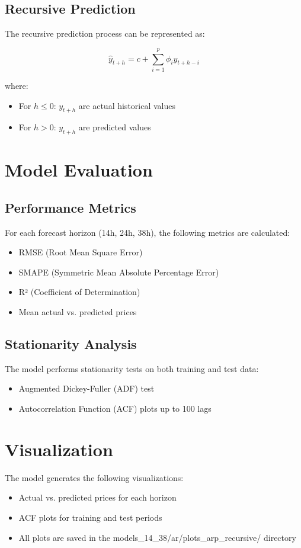 \documentclass{article}
\begin{document}
\subsection{Recursive Prediction}
The recursive prediction process can be represented as:

\begin{equation}
\hat{y}_{t+h} = c + \sum_{i=1}^{p} \phi_i y_{t+h-i}
\end{equation}

where:
\begin{itemize}
    \item For $h \leq 0$: $y_{t+h}$ are actual historical values
    \item For $h > 0$: $y_{t+h}$ are predicted values
\end{itemize}

\section{Model Evaluation}

\subsection{Performance Metrics}
For each forecast horizon (14h, 24h, 38h), the following metrics are calculated:
\begin{itemize}
    \item RMSE (Root Mean Square Error)
    \item SMAPE (Symmetric Mean Absolute Percentage Error)
    \item R² (Coefficient of Determination)
    \item Mean actual vs. predicted prices
\end{itemize}

\subsection{Stationarity Analysis}
The model performs stationarity tests on both training and test data:
\begin{itemize}
    \item Augmented Dickey-Fuller (ADF) test
    \item Autocorrelation Function (ACF) plots up to 100 lags
\end{itemize}

\section{Visualization}
The model generates the following visualizations:
\begin{itemize}
    \item Actual vs. predicted prices for each horizon
    \item ACF plots for training and test periods
    \item All plots are saved in the models_14_38/ar/plots_arp_recursive/ directory
\end{itemize}
\end{document}
